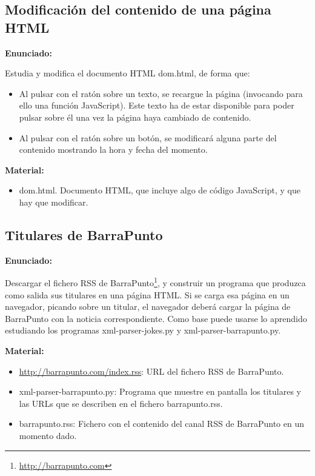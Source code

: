 \subsection{Modificación del contenido de una página HTML}
\label{subsec:xml-modificacion-html}

\textbf{Enunciado:}

Estudia y modifica el documento HTML dom.html, de forma que:

\begin{itemize}
\item Al pulsar con el ratón sobre un texto, se recargue la página (invocando para ello una función JavaScript). Este texto ha de estar disponible para poder pulsar sobre él una vez la página haya cambiado de contenido.
\item Al pulsar con el ratón sobre un botón, se modificará alguna parte del contenido mostrando la hora y fecha del momento.
\end{itemize}

\textbf{Material:}

\begin{itemize}
  \item dom.html. Documento HTML, que incluye algo de código JavaScript, y que hay que modificar.
\end{itemize}

\subsection{Titulares de BarraPunto}
\label{subsec:xml-barrapunto}

\textbf{Enunciado:}

Descargar el fichero RSS de BarraPunto\footnote{\url{http://barrapunto.com}}, y construir un programa que produzca como salida sus titulares en una página HTML. Si se carga esa página en un navegador,  picando sobre un titular, el navegador deberá cargar la página de BarraPunto con la noticia correspondiente. Como base puede usarse lo aprendido estudiando los programas xml-parser-jokes.py y xml-parser-barrapunto.py.

\textbf{Material:}

\begin{itemize}
\item \url{http://barrapunto.com/index.rss}: URL del fichero RSS de BarraPunto.
\item xml-parser-barrapunto.py: Programa que muestre en pantalla los titulares y las URLs que se describen en el fichero barrapunto.rss.
\item barrapunto.rss: Fichero con el contenido del canal RSS de BarraPunto en un momento dado.
\end{itemize}

